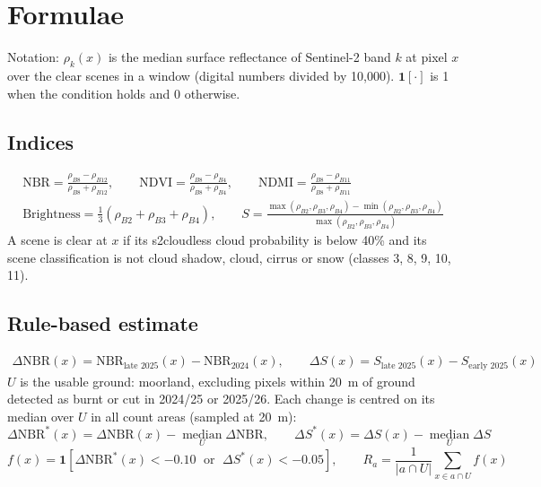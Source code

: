 \documentclass[11pt,a4paper]{article}
\begin{document}
\clearpage
\appendix
{}
\renewcommand{\thesection}{\Alph{section}}

\section{Formulae}\label{app:formulae}

Notation: $\rho_k(x)$ is the median surface reflectance of Sentinel-2 band $k$ at pixel $x$ over the clear scenes in a window (digital numbers divided by 10,000). $\mathbf{1}[\cdot]$ is 1 when the condition holds and 0 otherwise.

\subsection{Indices}
\begin{gather*}
\mathrm{NBR} = \frac{\rho_{B8}-\rho_{B12}}{\rho_{B8}+\rho_{B12}}, \qquad \mathrm{NDVI} = \frac{\rho_{B8}-\rho_{B4}}{\rho_{B8}+\rho_{B4}}, \qquad \mathrm{NDMI} = \frac{\rho_{B8}-\rho_{B11}}{\rho_{B8}+\rho_{B11}} \\[4pt]
\text{Brightness} = \tfrac{1}{3}\left(\rho_{B2}+\rho_{B3}+\rho_{B4}\right), \qquad S = \frac{\max(\rho_{B2},\rho_{B3},\rho_{B4})-\min(\rho_{B2},\rho_{B3},\rho_{B4})}{\max(\rho_{B2},\rho_{B3},\rho_{B4})}
\end{gather*}
A scene is clear at $x$ if its s2cloudless cloud probability is below 40\% and its scene classification is not cloud shadow, cloud, cirrus or snow (classes 3, 8, 9, 10, 11).

\subsection{Rule-based estimate}
\begin{gather*}
\Delta\mathrm{NBR}(x) = \mathrm{NBR}_{\text{late 2025}}(x) - \mathrm{NBR}_{\text{2024}}(x), \qquad
\Delta S(x) = S_{\text{late 2025}}(x) - S_{\text{early 2025}}(x)
\end{gather*}
$U$ is the usable ground: moorland, excluding pixels within 20~m of ground detected as burnt or cut in 2024/25 or 2025/26. Each change is centred on its median over $U$ in all count areas (sampled at 20~m):
\[
\Delta\mathrm{NBR}^{*}(x) = \Delta\mathrm{NBR}(x) - \operatorname*{median}_{U}\Delta\mathrm{NBR}, \qquad \Delta S^{*}(x) = \Delta S(x) - \operatorname*{median}_{U}\Delta S
\]
\[
f(x) = \mathbf{1}\!\left[\Delta\mathrm{NBR}^{*}(x) < -0.10 \;\text{ or }\; \Delta S^{*}(x) < -0.05\right], \qquad R_a = \frac{1}{|a\cap U|}\sum_{x\in a\cap U} f(x)
\]
\end{document}

